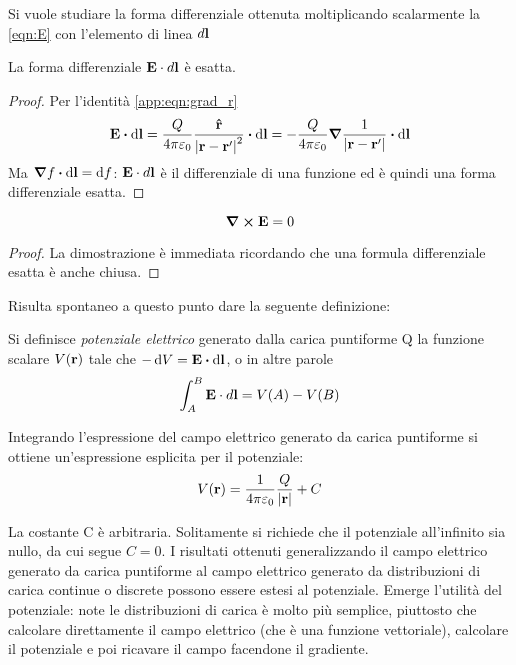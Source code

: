 Si vuole studiare la forma differenziale ottenuta moltiplicando scalarmente la \ref{eqn:E} con l'elemento di linea $d\vb{l}$
\begin{obs}
    La forma differenziale $\vb{E}\cdot d\vb{l}$ è esatta.
\end{obs}
\begin{proof}
    Per l'identità \eqref{app:eqn:grad_r}
    \[
        \vb{E}\vdot \dd{\vb{l}}=
        \frac{Q}{4\pi\epsilon_0}\frac{\vu{r}}{\abs{\vb{r}-\vb{r}'}^2}\vdot \dd{\vb{l}}=
        -\frac{Q}{4\pi\epsilon_0}\grad{\rec{\abs{\vb{r}-\vb{r}'}}}\vdot \dd{\vb{l}}
    \]
    Ma $\grad{f}\vdot\dd{\vb{l}}=\dd{f}$: $\vb{E}\cdot d\vb{l}$ è il differenziale di una funzione
    ed è quindi una forma differenziale esatta.
\end{proof}

\begin{cor}
    \begin{equation}
        \label{eqn:terza_maxwell}
        \curl{\vb{E}}=0
    \end{equation}
\end{cor}
\begin{proof}
    La dimostrazione è immediata ricordando che una formula differenziale esatta è anche chiusa.
\end{proof}

Risulta spontaneo a questo punto dare la seguente definizione:
\begin{defn}
    Si definisce \textit{potenziale elettrico} generato dalla carica puntiforme Q la funzione scalare $V(\vb{r})$ tale che
    $-\dd{V}=\vb{E}\vdot\dd{\vb{l}}$, o in altre parole
    \begin{equation}
        \int_A^B\vb{E}\cdot d\vb{l}=V(A)-V(B)
    \end{equation}
\end{defn}
Integrando l'espressione del campo elettrico generato da carica puntiforme
si ottiene un'espressione esplicita per il potenziale:
\[
    V(\vb{r})=\frac{1}{4\pi\varepsilon_0}\frac{Q}{\abs{\vb{r}}} + C
\]

La costante C è arbitraria. Solitamente si richiede che il potenziale all'infinito sia nullo, da cui segue $C=0$.
I risultati ottenuti generalizzando il campo elettrico generato da carica puntiforme al campo elettrico generato da distribuzioni
di carica continue o discrete possono essere estesi al potenziale. Emerge l'utilità del potenziale: note le distribuzioni di carica
è molto più semplice, piuttosto che calcolare direttamente il campo elettrico (che è una funzione vettoriale),
calcolare il potenziale e poi ricavare il campo facendone il gradiente.

